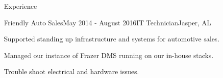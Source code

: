 \documentclass[
	11pt, %
]{crumpcv} %
\begin{document}
\begin{rSection}{Experience}

	\begin{rSubsection}{Friendly Auto Sales}{May 2014 - August 2016}{IT Technician}{Jasper, AL}
		\item Supported standing up infrastructure and systems for automotive sales.
		\item Managed our instance of Frazer DMS running on our in-house stacks.
		\item Trouble shoot electrical and hardware issues.
	\end{rSubsection}

\end{rSection}

\vspace{2em} %

\end{document}
